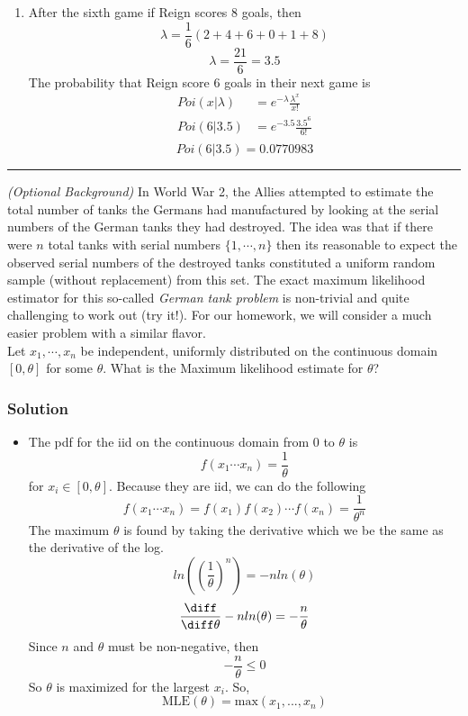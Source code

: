 \documentclass{article}
\begin{document}
\begin{aprob}
\begin{enumerate}
        \item After the sixth game if Reign scores 8 goals, then
        \[ \lambda = \frac{1}{6} (2+4+6+0+1+8) \]
        $$ \boxed {\lambda = \frac{21}{6} =  3.5}$$
        The probability that Reign score 6 goals in their next game is
        \begin{align*}
            Poi(x|\lambda) &= e^{-\lambda} \frac{\lambda^x}{x!} \\
            Poi(6|3.5) &= e^{-3.5} \frac{3.5^6}{6!} \\
        \end{align*}
        $$ \boxed { Poi(6|3.5) = 0.0770983 } $$
    \end{enumerate}
\end{aprob}

\rule{\textwidth}{0.25pt}
\newpage
\begin{aprob}
     \textit{(Optional Background)} In World War 2, the Allies attempted to estimate the total number of tanks the Germans had manufactured by looking at the serial numbers of the German tanks they had destroyed. The idea was that if there were $n$ total tanks with serial numbers $\{1,\cdots,n\}$ then its reasonable to expect the observed serial numbers of the destroyed tanks constituted a uniform random sample (without replacement) from this set. The exact maximum likelihood estimator for this so-called \emph{German tank problem} is non-trivial and quite challenging to work out (try it!). For our homework, we will consider a much easier problem with a similar flavor.\\

    Let $x_1,\cdots,x_n$ be independent, uniformly distributed on the continuous domain $[0,\theta]$ for some $\theta$. What is the Maximum likelihood estimate for $\theta$?
    \subsubsection*{Solution}
    \begin{itemize}
        \item The pdf for the iid on the continuous domain from 0 to $\theta$ is
            \[ f(x_1 \cdots x_n) = \frac{1}{\theta} \]
            for $x_i \in [0,\theta]$. Because they are iid, we can do the following
            \[ f(x_1 \cdots x_n) = f(x_1)f(x_2) \cdots f(x_n) = \frac{1}{\theta^n} \]
            The maximum $\theta$ is found by taking the derivative which we be the same as the derivative of the log.
            \[ ln((\frac{1}{\theta})^n) = -n ln(\theta) \]
            \[ \frac{\diff}{\diff \theta} -n ln(\theta) = -\frac{n}{\theta} \]
            Since $n$ and $\theta$ must be non-negative, then
            \[ -\frac{n}{\theta} \leq 0 \]
            So $\theta$ is maximized for the largest $x_i$. So,
            \[ \boxed{\text{MLE}(\theta) = \text{max}(x_1,...,x_n)} \]
    \end{itemize}
\end{aprob}
\end{document}
